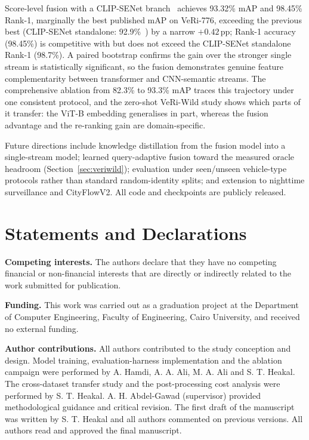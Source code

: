 \documentclass[10pt,a4paper]{article}
\begin{document}
Score-level fusion with a CLIP-SENet branch~\cite{lu2025clipsenet} achieves
93.32\% mAP and 98.45\% Rank-1, marginally the best published mAP on VeRi-776,
exceeding the previous best (CLIP-SENet standalone:
92.9\%~\cite{lu2025clipsenet}) by a narrow $+0.42$\,pp; Rank-1 accuracy
(98.45\%) is competitive with but does not exceed the CLIP-SENet standalone
Rank-1 (98.7\%). A paired bootstrap confirms the gain over the stronger single
stream is statistically significant, so the fusion demonstrates genuine feature
complementarity between transformer and CNN-semantic streams. The comprehensive
ablation from 82.3\% to 93.3\% mAP traces this trajectory under one consistent
protocol, and the zero-shot VeRi-Wild study shows which parts of it transfer:
the ViT-B embedding generalises in part, whereas the fusion advantage and the
re-ranking gain are domain-specific.

Future directions include knowledge distillation from the fusion model into a
single-stream model; learned query-adaptive fusion toward the measured oracle
headroom (Section~\ref{sec:veriwild}); evaluation under seen/unseen
vehicle-type protocols rather than standard random-identity splits; and
extension to nighttime surveillance and CityFlowV2. All code and checkpoints
are publicly released.

\section*{Statements and Declarations}

\noindent\textbf{Competing interests.} The authors declare that they have no
competing financial or non-financial interests that are directly or indirectly
related to the work submitted for publication.

\medskip\noindent\textbf{Funding.} This work was carried out as a graduation
project at the Department of Computer Engineering, Faculty of Engineering,
Cairo University, and received no external funding.

\medskip\noindent\textbf{Author contributions.} All authors contributed to the
study conception and design. Model training, evaluation-harness implementation
and the ablation campaign were performed by A. Hamdi, A. A. Ali, M. A. Ali and
S. T. Heakal. The cross-dataset transfer study and the post-processing cost
analysis were performed by S. T. Heakal. A. H. Abdel-Gawad (supervisor)
provided methodological guidance and critical revision. The first draft of the
manuscript was written by S. T. Heakal and all authors commented on previous
versions. All authors read and approved the final manuscript.
\end{document}
